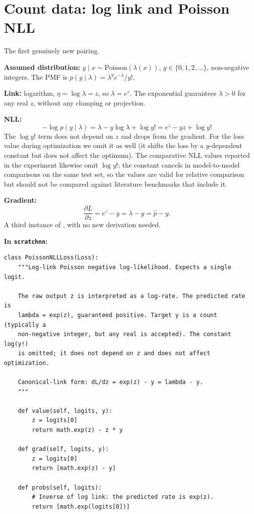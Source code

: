 
\section{Count data: log link and Poisson NLL}\label{sec:poisson}

The first genuinely new pairing.

\textbf{Assumed distribution:} $y \mid x \sim \mathrm{Poisson}(\lambda(x))$,
$y \in \{0, 1, 2, \ldots\}$, non-negative integers. The PMF is
$p(y \mid \lambda) = \lambda^y e^{-\lambda} / y!$.

\textbf{Link:} logarithm, $\eta = \log \lambda = z$, so $\lambda = e^z$.
The exponential guarantees $\lambda > 0$ for any real $z$, without any
clamping or projection.

\textbf{NLL:}
\[
  -\log p(y \mid \lambda) = \lambda - y \log \lambda + \log y! = e^z - y z + \log y!
\]
The $\log y!$ term does not depend on $z$ and drops from the gradient.
For the loss value during optimization we omit it as well (it shifts the
loss by a $y$-dependent constant but does not affect the optimum).
The comparative NLL values reported in the experiment likewise omit
$\log y!$; the constant cancels in model-to-model comparisons on the
same test set, so the values are valid for relative comparison but
should not be compared against literature benchmarks that include it.

\textbf{Gradient:}
\[
  \frac{\partial L}{\partial z} = e^z - y = \lambda - y = \hat{p} - y.
\]
A third instance of , with no new derivation
needed.

\textbf{In \texttt{scratchnn}:}

\begin{lstlisting}
class PoissonNLLLoss(Loss):
    """Log-link Poisson negative log-likelihood. Expects a single logit.

    The raw output z is interpreted as a log-rate. The predicted rate is
    lambda = exp(z), guaranteed positive. Target y is a count (typically a
    non-negative integer, but any real is accepted). The constant log(y!)
    is omitted; it does not depend on z and does not affect optimization.

    Canonical-link form: dL/dz = exp(z) - y = lambda - y.
    """

    def value(self, logits, y):
        z = logits[0]
        return math.exp(z) - z * y

    def grad(self, logits, y):
        z = logits[0]
        return [math.exp(z) - y]

    def probs(self, logits):
        # Inverse of log link: the predicted rate is exp(z).
        return [math.exp(logits[0])]
\end{lstlisting}

